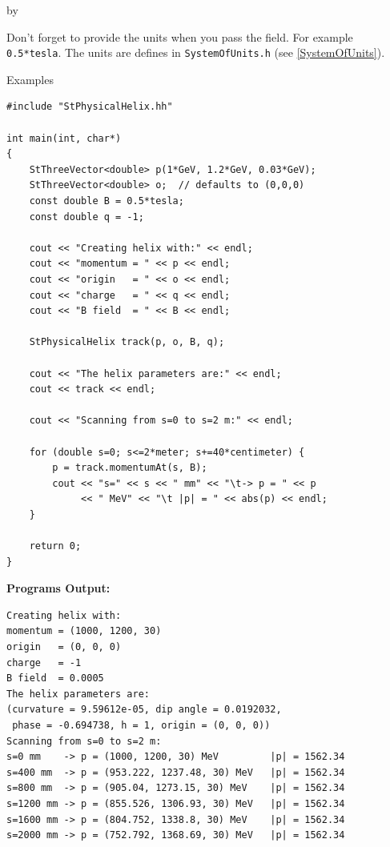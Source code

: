 \documentclass[twoside]{article}
\newcommand{\entrylabel}[1]{\mbox{\textbf{{#1}}}\hfil}%
\newenvironment{entry}
{\begin{list}{}%
    {\renewcommand{\makelabel}{\entrylabel}%
     \setlength{\labelwidth}{90pt}%
     \setlength{\leftmargin}{\labelwidth}
     \advance\leftmargin by \labelsep%
      }%
    }%
  {\end{list}}
\newcommand{\Entrylabel}[1]%
{\raisebox{0pt}[1ex][0pt]{\makebox[\labelwidth][l]%
    {\parbox[t]{\labelwidth}{\hspace{0pt}\textbf{{#1}}}}}}
\newenvironment{Entry}%
{\renewcommand{\entrylabel}{\Entrylabel}\begin{entry}}%
  {\end{entry}}
\begin{document}
\begin{description}
\begin{Entry}
    Don't forget to provide the units when you pass the field. For example
    \texttt{0.5*tesla}. The units are defines in \texttt{SystemOfUnits.h}
    (see \ref{SystemOfUnits}).
    
\item[Examples]
{\footnotesize
\begin{verbatim}
#include "StPhysicalHelix.hh"

int main(int, char*)
{
    StThreeVector<double> p(1*GeV, 1.2*GeV, 0.03*GeV);
    StThreeVector<double> o;  // defaults to (0,0,0)
    const double B = 0.5*tesla;
    const double q = -1;

    cout << "Creating helix with:" << endl;
    cout << "momentum = " << p << endl;
    cout << "origin   = " << o << endl;
    cout << "charge   = " << q << endl;
    cout << "B field  = " << B << endl;

    StPhysicalHelix track(p, o, B, q);

    cout << "The helix parameters are:" << endl;
    cout << track << endl;
    
    cout << "Scanning from s=0 to s=2 m:" << endl;

    for (double s=0; s<=2*meter; s+=40*centimeter) {
        p = track.momentumAt(s, B);
        cout << "s=" << s << " mm" << "\t-> p = " << p
             << " MeV" << "\t |p| = " << abs(p) << endl; 
    }
    
    return 0;
}
\end{verbatim}
}%
{\bf Programs Output:}
{\footnotesize
\begin{verbatim}
Creating helix with:
momentum = (1000, 1200, 30)
origin   = (0, 0, 0)
charge   = -1
B field  = 0.0005
The helix parameters are:
(curvature = 9.59612e-05, dip angle = 0.0192032,
 phase = -0.694738, h = 1, origin = (0, 0, 0))
Scanning from s=0 to s=2 m:
s=0 mm    -> p = (1000, 1200, 30) MeV         |p| = 1562.34
s=400 mm  -> p = (953.222, 1237.48, 30) MeV   |p| = 1562.34
s=800 mm  -> p = (905.04, 1273.15, 30) MeV    |p| = 1562.34
s=1200 mm -> p = (855.526, 1306.93, 30) MeV   |p| = 1562.34
s=1600 mm -> p = (804.752, 1338.8, 30) MeV    |p| = 1562.34
s=2000 mm -> p = (752.792, 1368.69, 30) MeV   |p| = 1562.34
\end{verbatim}
} %
\end{Entry}

\clearpage

%
%

\end{description}
\end{document}
